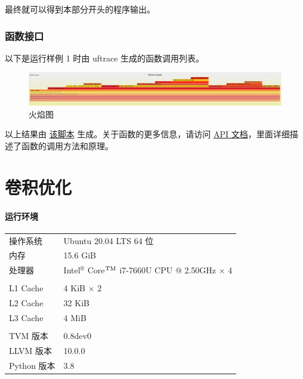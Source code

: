 \documentclass[UTF8]{ctexart}
\begin{document}
最终就可以得到本部分开头的程序输出。

\section{函数接口}

以下是运行样例 1 时由 uftrace\cite{uft} 生成的函数调用列表。


\begin{figure}[H]
    \centering
        \includegraphics[width=\textwidth]{img/flame.png}
    \caption{火焰图\cite{flame}}
    \label{fig:flame}
\end{figure}

以上结果由 \href{run:../opg/uftrace.sh}{该脚本} 生成。关于函数的更多信息，请访问 \href{run:../opg/target/doc/opg/index.html}{API 文档}，里面详细描述了函数的调用方法和原理。%

\vspace*{5em}

\part{卷积优化}
\subsection*{运行环境}
\begin{tabular}{ll}
    操作系统 & Ubuntu 20.04 LTS 64 位\\
    内存 & 15.6 GiB \\
    处理器 & Intel$^\circledR$ Core$^{\rm TM}$ i7-7660U CPU @ 2.50GHz $\times$ 4\\
    &\\
    L1 Cache & 4 KiB $\times$ 2 \\
    L2 Cache & 32 KiB \\
    L3 Cache & 4 MiB \\
    &\\
    TVM 版本 & 0.8dev0 \\
    LLVM 版本 & 10.0.0 \\
    Python 版本 & 3.8 \\
\end{tabular}
\end{document}
